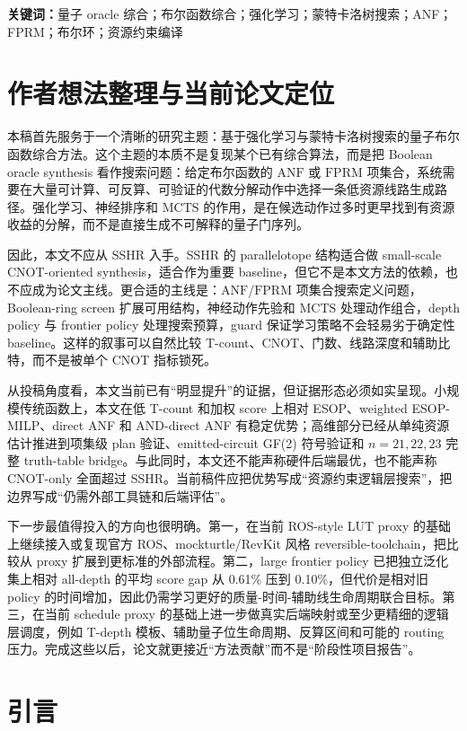 \documentclass[UTF8,fontset=macnew,11pt]{ctexart}
\newcommand{\anf}{\ensuremath{\mathrm{ANF}}}
\newcommand{\fprm}{\ensuremath{\mathrm{FPRM}}}
\newcommand{\mcts}{\ensuremath{\mathrm{MCTS}}}
\newcommand{\ttable}{truth-table}
\begin{document}
\noindent\textbf{关键词：}量子 oracle 综合；布尔函数综合；强化学习；蒙特卡洛树搜索；ANF；FPRM；布尔环；资源约束编译

\section*{作者想法整理与当前论文定位}

本稿首先服务于一个清晰的研究主题：基于强化学习与蒙特卡洛树搜索的量子布尔函数综合方法。这个主题的本质不是复现某个已有综合算法，而是把 Boolean oracle synthesis 看作搜索问题：给定布尔函数的 \anf{} 或 \fprm{} 项集合，系统需要在大量可计算、可反算、可验证的代数分解动作中选择一条低资源线路生成路径。强化学习、神经排序和 \mcts{} 的作用，是在候选动作过多时更早找到有资源收益的分解，而不是直接生成不可解释的量子门序列。

因此，本文不应从 SSHR 入手。SSHR 的 parallelotope 结构适合做 small-scale CNOT-oriented synthesis，适合作为重要 baseline，但它不是本文方法的依赖，也不应成为论文主线。更合适的主线是：\anf{}/\fprm{} 项集合搜索定义问题，Boolean-ring screen 扩展可用结构，神经动作先验和 \mcts{} 处理动作组合，depth policy 与 frontier policy 处理搜索预算，guard 保证学习策略不会轻易劣于确定性 baseline。这样的叙事可以自然比较 T-count、CNOT、门数、线路深度和辅助比特，而不是被单个 CNOT 指标锁死。

从投稿角度看，本文当前已有“明显提升”的证据，但证据形态必须如实呈现。小规模传统函数上，本文在低 T-count 和加权 score 上相对 ESOP、weighted ESOP-MILP、direct ANF 和 AND-direct ANF 有稳定优势；高维部分已经从单纯资源估计推进到项集级 plan 验证、emitted-circuit GF(2) 符号验证和 $n=21,22,23$ 完整 \ttable{} bridge。与此同时，本文还不能声称硬件后端最优，也不能声称 CNOT-only 全面超过 SSHR。当前稿件应把优势写成“资源约束逻辑层搜索”，把边界写成“仍需外部工具链和后端评估”。

下一步最值得投入的方向也很明确。第一，在当前 ROS-style LUT proxy 的基础上继续接入或复现官方 ROS、mockturtle/RevKit 风格 reversible-toolchain，把比较从 proxy 扩展到更标准的外部流程。第二，large frontier policy 已把独立泛化集上相对 all-depth 的平均 score gap 从 0.61\% 压到 0.10\%，但代价是相对旧 policy 的时间增加，因此仍需学习更好的质量-时间-辅助线生命周期联合目标。第三，在当前 schedule proxy 的基础上进一步做真实后端映射或至少更精细的逻辑层调度，例如 T-depth 模板、辅助量子位生命周期、反算区间和可能的 routing 压力。完成这些以后，论文就更接近“方法贡献”而不是“阶段性项目报告”。

\section{引言}
\end{document}
